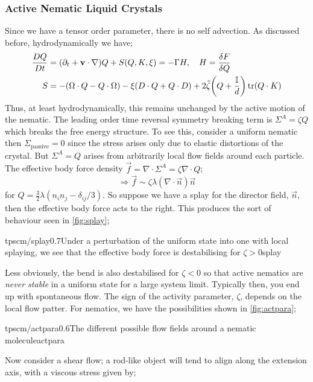 \subsubsection{Active Nematic Liquid Crystals}
Since we have a tensor order parameter, there is no self advection. As discussed before, hydrodynamically we have;
\begin{align*}
\frac{DQ}{Dt} &= (\del_t + \vec{v}\cdot\nabla)Q + S(Q, K, \xi) = -\Gamma H, \quad H = \frac{\delta F}{\delta Q} \\
S &= - (\Omega \cdot Q - Q\cdot\Omega) - \xi \left(D \cdot Q + Q\cdot D\right) + 2\tilde{\zeta}\left(Q + \frac{\mathbb{I}}{d}\right)\tr(Q\cdot K)
\end{align*} 
Thus, at least hydrodynamically, this remains unchanged by the active motion of the nematic. The leading order time reversal symmetry breaking term is $\Sigma^{A} = \zeta Q$ which breaks the free energy structure. To see this, consider a uniform nematic then $\Sigma_{\text{passive}} = 0$ since the stress arises only due to elastic distortions of the crystal. But $\Sigma^{A} = Q$ arises from arbitrarily local flow fields around each particle. The effective body force density $\vec{f} = \nabla\cdot\Sigma^{A} = \zeta \nabla \cdot Q$;
\begin{equation}
\Rightarrow \vec{f} \sim \zeta \lambda (\nabla \cdot\vec{n})\vec{n}
\end{equation}
for $Q = \tfrac{3}{2}\lambda(n_i n_j - \delta_{ij}/3)$. So suppose we have a splay for the director field, $\vec{n}$, then the effective body force acts to the right. This produces the sort of behaviour seen in \autoref{fig:splay};
\begin{mygraphic}{tpscm/splay}{0.7}{Under a perturbation of the uniform state into one with local splaying, we see that the effective body force is destabilising for $\zeta > 0$}{splay}\end{mygraphic}
Less obviously, the bend is also destabilised for $\zeta < 0$ so that active nematics are \emph{never stable} in a uniform state for a large system limit. Typically then, you end up with spontaneous flow. The sign of the activity parameter, $\zeta$, depends on the local flow patter. For nematics, we have the possibilities shown in \autoref{fig:actpara};
\begin{mygraphic}{tpscm/actpara}{0.6}{The different possible flow fields around a nematic molecule}{actpara}\end{mygraphic}
Now consider a shear flow; a rod-like object will tend to align along the extension axis, with a viscous stress given by;
